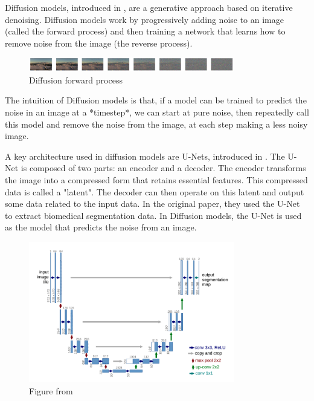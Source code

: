 Diffusion models, introduced in \cite{ho_denoising_2020}, are a generative approach based on iterative denoising. Diffusion models work by progressively adding noise to an image (called the forward process) and then training a network that learns how to remove noise from the image (the reverse process).

\begin{figure}[htbp]
\centering
\includegraphics[width=0.8\textwidth]{figures/noise_to_image.png}
\caption{Diffusion forward process}
\label{fig:noise_to_image}
\end{figure}

The intuition of Diffusion models is that, if a model can be trained to predict the noise in an image at a *timestep*, we can start at pure noise, then repeatedly call this model and remove the noise from the image, at each step making a less noisy image.

A key architecture used in diffusion models are U-Nets, introduced in \cite{ronneberger_u-net_2015}. The U-Net is composed of two parts: an encoder and a decoder. The encoder transforms the image into a compressed form that retains essential features. This compressed data is called a "latent". The decoder can then operate on this latent and output some data related to the input data. In the original paper, they used the U-Net to extract biomedical segmentation data. In Diffusion models, the U-Net is used as the model that predicts the noise from an image.

\begin{figure}[htbp]
\centering
\includegraphics[width=0.8\textwidth]{figures/unet_architecture.png}
\caption{Figure from \cite{ronneberger_u-net_2015}}
\label{fig:unet_architecture}
\end{figure}

